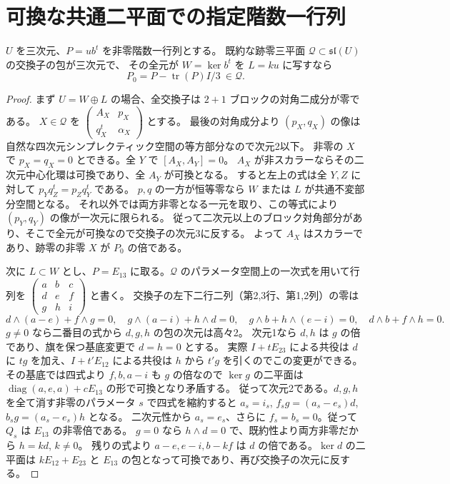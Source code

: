 \section{可換な共通二平面での指定階数一行列}
\label{sec:marked-commuting-intersection}
\begin{lemma}\label{lem:three-bracket-rank-one-compression}
$U$ を三次元、$P=u b^t$ を非零階数一行列とする。
既約な跡零三平面 $\mathcal Q\subset\mathfrak{sl}(U)$ の交換子の包が三次元で、
その全元が $W=\ker b^t$ を $L=ku$ に写すなら
\[
                        P_0=P-\operatorname{tr}(P)I/3\ \in\mathcal Q .
\]
\end{lemma}
\begin{proof}
まず $U=W\oplus L$ の場合、全交換子は $2+1$ ブロックの対角二成分が零である。
$X\in\mathcal Q$ を $\left(\begin{smallmatrix}A_X&p_X\\q_X^t&\alpha_X\end{smallmatrix}\right)$ とする。
最後の対角成分より $(p_X,q_X)$ の像は自然な四次元シンプレクティック空間の等方部分なので次元2以下。
非零の $X$ で $p_X=q_X=0$ とできる。全 $Y$ で $[A_X,A_Y]=0$。
$A_X$ が非スカラーならその二次元中心化環は可換であり、全 $A_Y$ が可換となる。
すると左上の式は全 $Y,Z$ に対して $p_Y q_Z^t=p_Z q_Y^t$ である。
$p,q$ の一方が恒等零なら $W$ または $L$ が共通不変部分空間となる。
それ以外では両方非零となる一元を取り、この等式により $(p_Y,q_Y)$ の像が一次元に限られる。
従って二次元以上のブロック対角部分があり、そこで全元が可換なので交換子の次元3に反する。
よって $A_X$ はスカラーであり、跡零の非零 $X$ が $P_0$ の倍である。

次に $L\subset W$ とし、$P=E_{13}$ に取る。$\mathcal Q$ のパラメータ空間上の一次式を用いて行列を
$\left(\begin{smallmatrix}a&b&c\\d&e&f\\g&h&i\end{smallmatrix}\right)$ と書く。
交換子の左下二行二列（第2,3行、第1,2列）の零は
\[
 d\wedge(a-e)+f\wedge g=0,\quad
 g\wedge(a-i)+h\wedge d=0,\quad
 g\wedge b+h\wedge(e-i)=0,\quad d\wedge b+f\wedge h=0 .
\]
$g\ne0$ なら二番目の式から $d,g,h$ の包の次元は高々2。
次元1なら $d,h$ は $g$ の倍であり、旗を保つ基底変更で $d=h=0$ とする。
実際 $I+tE_{23}$ による共役は $d$ に $tg$ を加え、$I+t'E_{12}$ による共役は
$h$ から $t'g$ を引くのでこの変更ができる。その基底では四式より $f,b,a-i$ も $g$ の倍なので $\ker g$ の二平面は
$\operatorname{diag}(a,e,a)+cE_{13}$ の形で可換となり矛盾する。
従って次元2である。$d,g,h$ を全て消す非零のパラメータ $s$ で四式を縮約すると
$a_s=i_s$, $f_sg=(a_s-e_s)d$, $b_sg=(a_s-e_s)h$ となる。
二次元性から $a_s=e_s$、さらに $f_s=b_s=0$。従って $Q_s$ は $E_{13}$ の非零倍である。
$g=0$ なら $h\wedge d=0$ で、既約性より両方非零だから $h=kd$, $k\ne0$。
残りの式より $a-e,e-i,b-kf$ は $d$ の倍である。$\ker d$ の二平面は
$kE_{12}+E_{23}$ と $E_{13}$ の包となって可換であり、再び交換子の次元に反する。
\end{proof}

